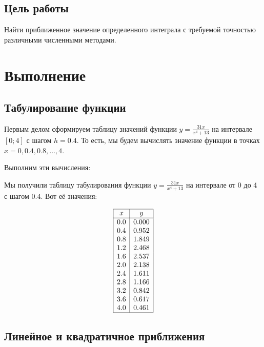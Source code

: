 \documentclass{article}
\begin{document}
\subsection{Цель работы}
      Найти приближенное значение определенного интеграла с требуемой точностью различными численными методами.

\section{Выполнение}

      
      \subsection{Табулирование функции}

            Первым делом сформируем таблицу значений функции \(y=\frac{31x}{x^4+13}\) на интервале \([0;4]\) с шагом \(h=0.4\). То есть, мы будем вычислять значение функции в точках \(x=0, 0.4, 0.8, \ldots, 4\).

            Выполним эти вычисления:

            Мы получили таблицу табулирования функции \(y=\frac{31x}{x^4+13}\) на интервале от 0 до 4 с шагом 0.4. Вот её значения:

            \[
            \begin{array}{|c|c|}
            \hline
            x & y \\
            \hline
            0.0 & 0.000 \\
            0.4 & 0.952 \\
            0.8 & 1.849 \\
            1.2 & 2.468 \\
            1.6 & 2.537 \\
            2.0 & 2.138 \\
            2.4 & 1.611 \\
            2.8 & 1.166 \\
            3.2 & 0.842 \\
            3.6 & 0.617 \\
            4.0 & 0.461 \\
            \hline
            \end{array}
            \]

      \subsection{Линейное и квадратичное приближения}
\end{document}
